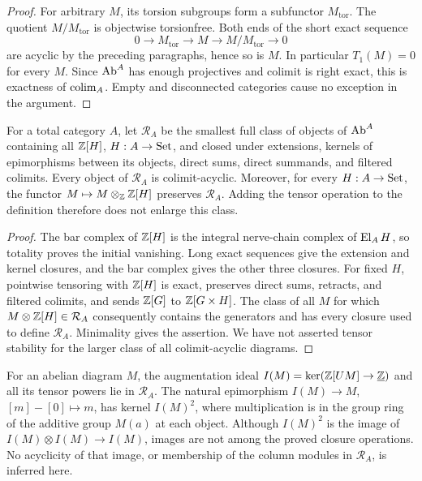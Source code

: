 \begin{proof}
For arbitrary $M$, its torsion subgroups form a subfunctor $M_{\mathrm{tor}}$. The quotient $M/M_{\mathrm{tor}}$ is objectwise torsionfree. Both ends of the short exact sequence
\[
0\longrightarrow M_{\mathrm{tor}}\longrightarrow M
\longrightarrow M/M_{\mathrm{tor}}\longrightarrow0
\]
are acyclic by the preceding paragraphs, hence so is $M$. In particular $T_1(M)=0$ for every $M$. Since $\mathrm{Ab}^A$ has enough projectives and colimit is right exact, this is exactness of $\operatorname*{colim}_A$. Empty and disconnected categories cause no exception in the argument.
\end{proof}

\begin{proposition}\label{A:closure}
For a total category $A$, let $\mathcal R_A$ be the smallest full class of objects of $\mathrm{Ab}^A$ containing all $\mathbb Z[H]$, $H:A\to\mathrm{Set}$, and closed under extensions, kernels of epimorphisms between its objects, direct sums, direct summands, and filtered colimits. Every object of $\mathcal R_A$ is colimit-acyclic. Moreover, for every $H:A\to\mathrm{Set}$, the functor $M\mapsto M\otimes_\mathbb Z\mathbb Z[H]$ preserves $\mathcal R_A$. Adding the tensor operation to the definition therefore does not enlarge this class.
\end{proposition}
\begin{proof}
The bar complex of $\mathbb Z[H]$ is the integral nerve-chain complex of $\operatorname{El}_AH$, so totality proves the initial vanishing. Long exact sequences give the extension and kernel closures, and the bar complex gives the other three closures. For fixed $H$, pointwise tensoring with $\mathbb Z[H]$ is exact, preserves direct sums, retracts, and filtered colimits, and sends $\mathbb Z[G]$ to $\mathbb Z[G\times H]$. The class of all $M$ for which $M\otimes\mathbb Z[H]\in\mathcal R_A$ consequently contains the generators and has every closure used to define $\mathcal R_A$. Minimality gives the assertion. We have not asserted tensor stability for the larger class of all colimit-acyclic diagrams.
\end{proof}

\begin{remark}\label{A:membership}
For an abelian diagram $M$, the augmentation ideal $I(M)=\ker(\mathbb Z[UM]\to\underline{\mathbb Z})$ and all its tensor powers lie in $\mathcal R_A$. The natural epimorphism $I(M)\to M$, $[m]-[0]\mapsto m$, has kernel $I(M)^2$, where multiplication is in the group ring of the additive group $M(a)$ at each object. Although $I(M)^2$ is the image of $I(M)\otimes I(M)\to I(M)$, images are not among the proved closure operations. No acyclicity of that image, or membership of the column modules in $\mathcal R_A$, is inferred here.
\end{remark}
